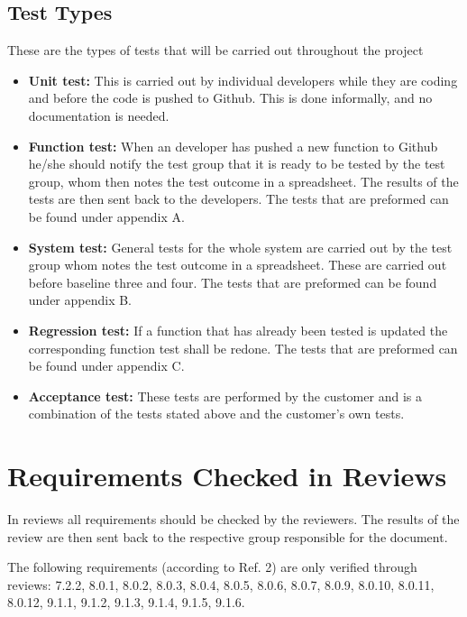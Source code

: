 \documentclass{article}
\begin{document}
		\subsection{Test Types}
		
These are the types of tests that will be carried out throughout the project


\begin{itemize}
  \item \textbf{Unit test:} This is carried out by individual developers while they are coding and before the code is pushed to Github. This is done informally, and no documentation is needed.
  
  \item \textbf{Function test:} When an developer has pushed a new function to Github he/she should notify the test group that it is ready to be tested by the test group, whom then notes the test outcome in a spreadsheet. The results of the tests are then sent back to the developers. The tests that are preformed can be found under appendix A. 
  
   \item \textbf{System test:} General tests for the whole system are carried out by the test group whom notes the test outcome in a spreadsheet. These are carried out before baseline three and four. The tests that are preformed can be found under appendix B. 
   
      \item \textbf{Regression test:} If a function that has already been tested is updated the corresponding function test shall be redone. The tests that are preformed can be found under appendix C. 
      
         \item \textbf{Acceptance test:} These tests are performed by the customer and is a combination of the tests stated above and the customer's own tests.
\end{itemize}


\section{Requirements Checked in Reviews}
In reviews all requirements should be checked by the reviewers. The results of the review are then sent back to the respective group responsible for the document.

The following requirements (according to Ref. 2) are only verified through
reviews: 7.2.2, 8.0.1, 8.0.2, 8.0.3, 8.0.4, 8.0.5, 8.0.6, 8.0.7, 8.0.9, 8.0.10, 8.0.11, 8.0.12, 9.1.1, 9.1.2, 9.1.3, 9.1.4, 9.1.5, 9.1.6.
\end{document}
